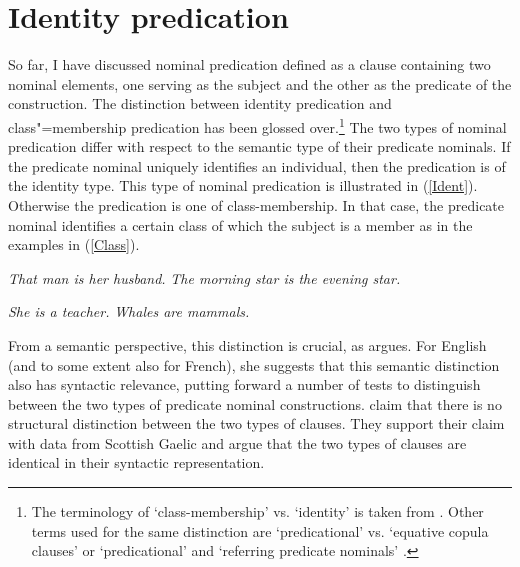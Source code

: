 \section{Identity predication}\label{Identity} 

So far, I have discussed nominal predication defined as a clause containing two nominal elements, one serving as the subject and the other as the predicate of the construction. 
The distinction between identity predication and class"=membership predication has been glossed over.\footnote{The terminology of  `class-membership' vs. `identity' is taken from \citet{Stassen:1997}. 
Other terms used for the same distinction are `predicational' vs. `equative copula clauses' \citep{Adger:2003} or `predicational' and `referring predicate nominals' \citep{Doron:1988}.}
The two types of nominal predication differ with respect to the semantic type of their predicate nominals. 
If the predicate nominal uniquely identifies an individual, then the predication is of the identity type. 
This type of nominal predication is illustrated in (\ref{Ident}). 
Otherwise the predication is one of class-membership. 
In that case, the predicate nominal identifies a certain class of which the subject is a member as in the examples in (\ref{Class}).

\begin{exe}\ex\label{Ident}
\begin{xlist}
\ex \textit{That man is her husband.}
\ex \textit{The morning star is the evening star.}
\end{xlist}
\end{exe}

\begin{exe}\ex\label{Class} 
\begin{xlist}\ex \textit{She is a teacher.}
\ex \textit{Whales are mammals. }
\end{xlist}
\end{exe}

From a semantic perspective, this distinction is crucial, as \citet{Doron:1988} argues. 
For English (and to some extent also for French), she suggests that this semantic distinction also has syntactic relevance, putting forward a number of tests to distinguish between the two types of predicate nominal constructions. 
\citet{Adger:2003} claim that there is no structural distinction between the two types of clauses. 
They support their claim with data from Scottish Gaelic and argue that the two types of clauses are identical in their syntactic representation.

